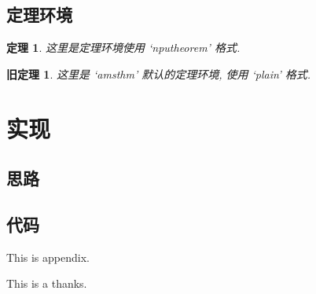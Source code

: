 \documentclass[twoside,UTF8,phd,multibib]{nputhesis}
\newtheorem{thm}{定理}[section]
\theoremstyle{plain}
\newtheorem{oldthm}{旧定理}[section]
\begin{document}
\section{定理环境}
\lipsum[1]
\begin{thm}
    这里是定理环境使用 `nputheorem' 格式.
\end{thm}
\lipsum[2]
\begin{oldthm}
    这里是 `amsthm' 默认的定理环境, 使用 `plain' 格式.
\end{oldthm}
\lipsum[3]

\chapter{实现}
\section{思路}
\section{代码}

\backmatter



\Appendix
This is appendix.

\Thanks
This is a thanks.



\statement
\end{document}
